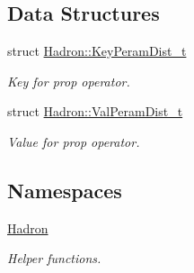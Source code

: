 \subsection*{Data Structures}
\begin{DoxyCompactItemize}
\item 
struct \mbox{\hyperlink{structHadron_1_1KeyPeramDist__t}{Hadron\+::\+Key\+Peram\+Dist\+\_\+t}}
\begin{DoxyCompactList}\small\item\em Key for prop operator. \end{DoxyCompactList}\item 
struct \mbox{\hyperlink{structHadron_1_1ValPeramDist__t}{Hadron\+::\+Val\+Peram\+Dist\+\_\+t}}
\begin{DoxyCompactList}\small\item\em Value for prop operator. \end{DoxyCompactList}\end{DoxyCompactItemize}
\subsection*{Namespaces}
\begin{DoxyCompactItemize}
\item 
 \mbox{\hyperlink{namespaceHadron}{Hadron}}
\begin{DoxyCompactList}\small\item\em Helper functions. \end{DoxyCompactList}\end{DoxyCompactItemize}
